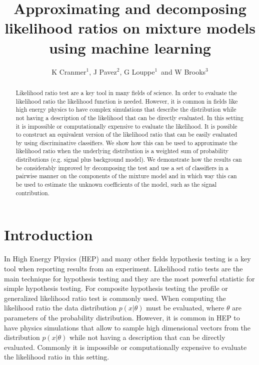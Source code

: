 \documentclass[a4paper]{jpconf}
\begin{document}
\title{Approximating and decomposing likelihood ratios on mixture models using machine learning}

\author{K Cranmer$^1$, J Pavez$^2$,
G Louppe$^1$\ and  W Brooks$^3$}

\address{$^1$ Physics Department, New York University, New York, NY 10003, U.S.A.}
\address{$^2$ Informatics Department, Universidad T\'ecnica Federico Santa Mar\'ia, 1240 Av. Espa\~na, Valpara\'iso, Chile}
\address{$^3$ Physics Department, Universidad T\'ecnica Federico Santa Mar\'ia, 1240 Av. Espa\~na, Valpara\'iso, Chile}



\begin{abstract}
Likelihood ratio test are a key tool in many fields of science. In order to evaluate the likelihood ratio the likelihood function is needed. However, it is common in fields like high energy physics to have complex simulations that describe the distribution while not having a description of the likelihood that can be directly evaluated. In this setting it is impossible or computationally expensive to evaluate the likelihood. It is possible to construct an equivalent version of the likelihood ratio that can be easily evaluated by using discriminative classifiers. We show how this can be used to approximate the likelihood ratio when the underlying distribution is a weighted sum of probability distributions (e.g. signal plus background model). We demonstrate how the results can be considerably improved by decomposing the test and use a set of classifiers in a pairwise manner on the components of the mixture model and in which way this can be used to estimate the unknown coefficients of the model, such as the signal contribution.
\end{abstract}
\section{Introduction}

In High Energy Physics (HEP) and many other fields hypothesis testing is a key tool when reporting results from an experiment. Likelihood ratio tests are 
the main technique for hypothesis testing and they are the most powerful statistic for simple hypothesis testing. For composite hypothesis 
testing the profile or generalized likelihood ratio test is commonly used. When computing the likelihood ratio the data distribution $p(x|\theta)$ must 
be evaluated, where $\theta$ are parameters of the probability distribution. However, it is common in HEP to have physics simulations that allow to sample high dimensional vectors from the distribution $p(x|\theta)$ while not having a description that can be directly evaluated. Commonly it is impossible or computationally expensive to evaluate the likelihood ratio in this setting. %
\end{document}
